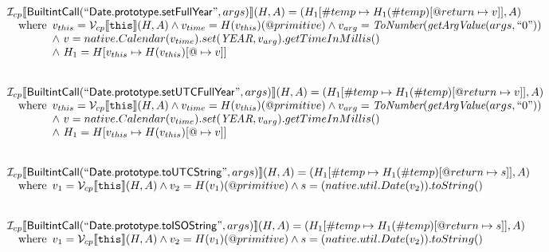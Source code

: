\[\begin{array}{l}
\mathcal{I} _{cp}\llbracket \mbox{\textsf{BuiltintCall}}(``\mbox{\textsf{Date.prototype.setFullYear}}",args)\rrbracket(H,A)
  = (H_1[\#temp \mapsto H_1(\#temp)[@return \mapsto v]], A)\\
\quad{\rm where}\begin{array}[t]{l}
  v_{this} = \mathcal{V} _{cp}\llbracket \mbox{\texttt{this}}\rrbracket (H,A) \land v_{time} = H(v_{this})(@primitive)
  \land v_{arg} = \emph{ToNumber}(\emph{getArgValue}(args, ``0"))\\
  \land\ v = native.Calendar(v_{time}).set(\emph{YEAR}, v_{arg}).getTimeInMillis()\\
  \land\ H_1 = H[v_{this} \mapsto H(v_{this})[@\mapsto v]]
  \end{array}\\
\\\\


\mathcal{I} _{cp}\llbracket \mbox{\textsf{BuiltintCall}}(``\mbox{\textsf{Date.prototype.setUTCFullYear}}",args)\rrbracket(H,A)
  = (H_1[\#temp \mapsto H_1(\#temp)[@return \mapsto v]], A)\\
\quad{\rm where}\begin{array}[t]{l}
  v_{this} = \mathcal{V} _{cp}\llbracket \mbox{\texttt{this}}\rrbracket (H,A) \land v_{time} = H(v_{this})(@primitive)
  \land v_{arg} = \emph{ToNumber}(\emph{getArgValue}(args, ``0"))\\
  \land\ v = native.Calendar(v_{time}).set(\emph{YEAR}, v_{arg}).getTimeInMillis()\\
  \land\ H_1 = H[v_{this} \mapsto H(v_{this})[@\mapsto v]]
  \end{array}\\
\\\\


\mathcal{I} _{cp}\llbracket \mbox{\textsf{BuiltintCall}}(``\mbox{\textsf{Date.prototype.toUTCString}}",args)\rrbracket(H,A)
  = (H_1[\#temp \mapsto H_1(\#temp)[@return \mapsto s]], A)\\
\quad{\rm where}\begin{array}[t]{l}
  v_1 = \mathcal{V} _{cp}\llbracket \mbox{\texttt{this}}\rrbracket (H,A) \land v_2 = H(v_1)(@primitive)
  \land s = (native.util.Date(v_2)).toString()
  \end{array}\\
\\\\


\mathcal{I} _{cp}\llbracket \mbox{\textsf{BuiltintCall}}(``\mbox{\textsf{Date.prototype.toISOString}}",args)\rrbracket(H,A)
  = (H_1[\#temp \mapsto H_1(\#temp)[@return \mapsto s]], A)\\
\quad{\rm where}\begin{array}[t]{l}
  v_1 = \mathcal{V} _{cp}\llbracket \mbox{\texttt{this}}\rrbracket (H,A) \land v_2 = H(v_1)(@primitive)
  \land s = (native.util.Date(v_2)).toString()
  \end{array}\\
\\\\

\end{array}
\]

